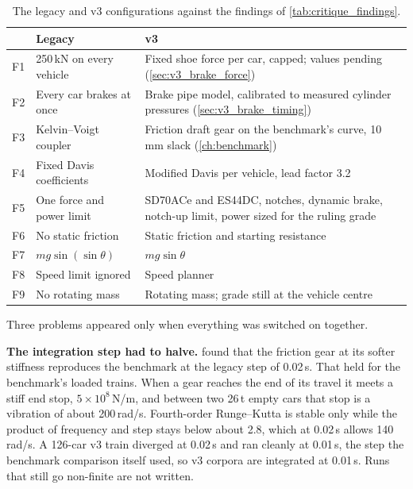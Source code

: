 \begin{table}[htbp]
    \centering
    \small
    \begin{tabular}{>{\raggedright}p{0.7cm}>{\raggedright}p{4.6cm}>{\raggedright\arraybackslash}p{8.0cm}}
        \toprule
        & Legacy & v3 \\
        \midrule
        F1 & 250\,kN on every vehicle & Fixed shoe force per car, capped; values pending (\cref{sec:v3_brake_force}) \\
        F2 & Every car brakes at once & Brake pipe model, calibrated to measured cylinder pressures (\cref{sec:v3_brake_timing}) \\
        F3 & Kelvin--Voigt coupler & Friction draft gear on the benchmark's curve, 10\,mm slack (\cref{ch:benchmark}) \\
        F4 & Fixed Davis coefficients & Modified Davis per vehicle, lead factor 3.2 \\
        F5 & One force and power limit & SD70ACe and ES44DC, notches, dynamic brake, notch-up limit, power sized for the ruling grade \\
        F6 & No static friction & Static friction and starting resistance \\
        F7 & $mg\sin(\sin\theta)$ & $mg\sin\theta$ \\
        F8 & Speed limit ignored & Speed planner \\
        F9 & No rotating mass & Rotating mass; grade still at the vehicle centre \\
        \bottomrule
    \end{tabular}
    \caption{The legacy and v3 configurations against the findings of \cref{tab:critique_findings}.}
    \label{tab:v3_config}
\end{table}

Three problems appeared only when everything was switched on together.

\textbf{The integration step had to halve.}  found that the friction gear at its softer stiffness reproduces the benchmark at the legacy step of 0.02\,s. That held for the benchmark's loaded trains. When a gear reaches the end of its travel it meets a stiff end stop, $5\times10^{8}$\,N/m, and between two 26\,t empty cars that stop is a vibration of about 200\,rad/s. Fourth-order Runge--Kutta is stable only while the product of frequency and step stays below about 2.8, which at 0.02\,s allows 140\,rad/s. A 126-car v3 train diverged at 0.02\,s and ran cleanly at 0.01\,s, the step the benchmark comparison itself used, so v3 corpora are integrated at 0.01\,s. Runs that still go non-finite are not written.

